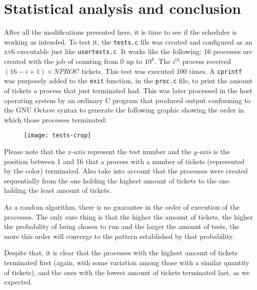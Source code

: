 \documentclass[12pt]{article}
\begin{document}
\section{Statistical analysis and conclusion}
After all the modifications presented here, it is time to see if the scheduler is working as intended. To test it, the \texttt{tests.c} file was created and configured as an xv6 executable just like \texttt{usertests.c}. It works like the following: 16 processes are created with the job of counting from 0 up to $10^8$. The $i^{th}$ process received $(16 - i + 1) \times NPROC$ tickets. This test was executed 100 times. A \texttt{cprintf} was purposely added to the \texttt{exit} function, in the \texttt{proc.c} file, to print the amount of tickets a process that just terminated had. This was later processed in the host operating system by an ordinary C program that produced output conforming to the GNU Octave syntax to generate the following graphic showing the order in which those processes terminated:

\begin{figure}[h]
\texttt{[image: tests-crop]}
\centering
\end{figure}

Please note that the \emph{x-axis} represent the test number and the \emph{y-axis} is the position between 1 and 16 that a process with a number of tickets (represented by the color) terminated. Also take into account that the processes were created sequentially from the one holding the highest amount of tickets to the one holding the least amount of tickets.

As a random algorithm, there is no guarantee in the order of execution of the processes. The only sure thing is that the higher the amount of tickets, the higher the probability of being chosen to run and the larger the amount of tests, the more this order will converge to the pattern established by that probability.

Despite that, it is clear that the processes with the highest amount of tickets terminated first (again, with some variation among those with a similar quantity of tickets), and the ones with the lowest amount of tickets terminated last, as we expected.



\end{document}
